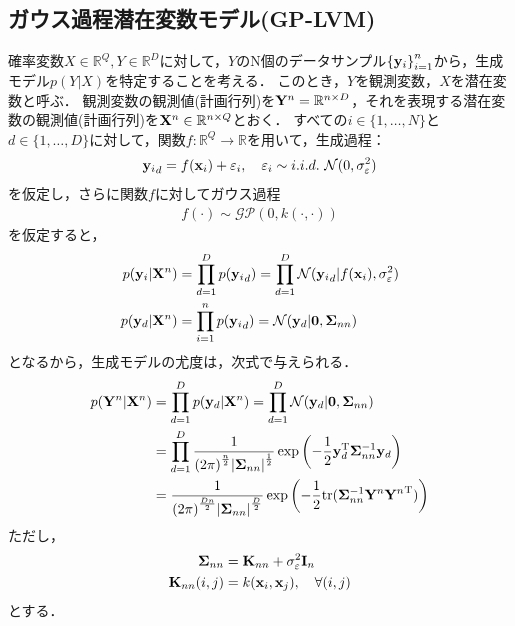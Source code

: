 \documentclass[11pt,a4j]{jarticle}
\begin{document}
      \subsection{ガウス過程潜在変数モデル(GP-LVM)}
        確率変数$X \in \mathbb{R}^{Q}, Y \in \mathbb{R}^{D}$に対して，$Y$のN個のデータサンプル${ \{ {\bf y}_i \} }_{i=1}^{n}$から，生成モデル$p(Y|X)$を特定することを考える．
        このとき，$Y$を観測変数，$X$を潜在変数と呼ぶ．
        観測変数の観測値(計画行列)を${\bf Y}^n = \mathbb{R}^{n \times D}$，それを表現する潜在変数の観測値(計画行列)を${\bf X}^n \in \mathbb{R}^{n \times Q}$とおく．
        すべての$i \in \{1,\dots,N\}$と$d \in \{1,\dots,D\}$に対して，関数$f: \mathbb{R}^Q \to \mathbb{R}$を用いて，生成過程：
        \begin{align}
          {{\bf y}_i}_d = f({\bf x}_i) + \varepsilon_i, ~~~
          \varepsilon_i \sim i.i.d. ~ \mathcal{N}(0, \sigma_{\varepsilon}^2)
        \end{align}
        を仮定し，さらに関数$f$に対してガウス過程
        \begin{align}
          f(\cdot) \sim \mathcal{GP}(0, k(\cdot,\cdot))
        \end{align}
        を仮定すると，
        \begin{align}
          p({\bf y}_i | {\bf X}^n) &= \prod_{d=1}^{D} p({{\bf y}_i}_d) = \prod_{d=1}^{D} \mathcal{N}({{\bf y}_i}_d | f({\bf x}_i), \sigma_\varepsilon^2 ) \\
          p({\bf y}_d | {\bf X}^n) &= \prod_{i=1}^{n} p({{\bf y}_i}_d) = \mathcal{N}({\bf y}_d | {\bf 0}, {\bf \Sigma}_{nn})
        \end{align}
        となるから，生成モデルの尤度は，次式で与えられる．
        \begin{align}
          p({\bf Y}^n|{\bf X}^n) &= \prod_{d=1}^{D} p({\bf y}_d | {\bf X}^n) = \prod_{d=1}^{D} \mathcal{N}({\bf y}_d | {\bf 0}, {\bf \Sigma}_{nn}) \\
          &= \prod_{d=1}^{D} \frac{1}{{(2 \pi)}^{\frac{n}{2}} {|{\bf \Sigma}_{nn}|}^{\frac{1}{2}}} \exp \left( - \frac{1}{2} {\bf y}_d^{\mathrm{T}} {\bf \Sigma}_{nn}^{-1} {\bf y}_d \right) \\
          &= \frac{1}{{(2 \pi)}^{\frac{Dn}{2}} {|{\bf \Sigma}_{nn}|}^{\frac{D}{2}}} \exp \left( - \frac{1}{2} {\rm tr}({\bf \Sigma}_{nn}^{-1} {{\bf Y}^n}{{\bf Y}^n}^{\mathrm{T}}) \right)
        \end{align}
        ただし，
        \begin{align}
          {\bf \Sigma}_{nn} &= {\bf K}_{nn} + \sigma_{\varepsilon}^2 {\bf I}_n \\
          {\bf K}_{nn}(i,j) &= k({\bf x}_i, {\bf x}_j), ~~~ \forall (i,j)
        \end{align}
        とする．
\end{document}
